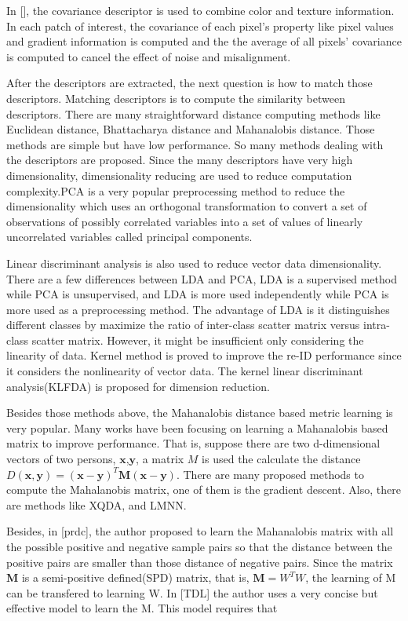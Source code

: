 \documentclass[conference,compsoc]{IEEEtran}
\begin{document}
In [], the covariance descriptor is used to combine color and texture information. In each patch of interest, the covariance of each pixel's property like pixel values and gradient information is computed and the the average of all pixels' covariance is computed to cancel the effect of noise and misalignment. 

After the descriptors are extracted, the next question is how to match those descriptors. Matching descriptors is to compute the similarity between descriptors. There are many straightforward distance computing methods like Euclidean distance, Bhattacharya distance and Mahanalobis distance.  Those methods are simple but have low performance. So many methods dealing with the descriptors are proposed. Since the many descriptors have very high dimensionality, dimensionality reducing are used to reduce computation complexity.PCA is a very popular preprocessing method to reduce the dimensionality which uses an orthogonal transformation to convert a set of observations of possibly correlated variables into a set of values of linearly uncorrelated variables called principal components. 

Linear discriminant analysis is also used to reduce vector data dimensionality. There are a few differences between LDA and PCA, LDA is a supervised method while PCA is unsupervised, and LDA is more used independently while PCA is more used as a preprocessing method. The advantage of LDA is it distinguishes different classes by maximize the ratio of inter-class scatter matrix versus intra-class scatter matrix. However, it might be insufficient only considering the linearity of data. Kernel method is proved to improve the re-ID performance since it considers the nonlinearity of vector data. The kernel linear discriminant analysis(KLFDA) is proposed for dimension reduction.  


Besides those methods above, the Mahanalobis distance based metric learning is very popular. Many works have been focusing on learning a Mahanalobis based matrix to improve performance. That is, suppose there are two d-dimensional vectors of two persons,  $\bm{x}$,$\bm{y}$, a matrix $M$ is used the calculate the distance $D(\bm{x},\bm{y}) = (\bm{x}-\bm{y})^T\bm{M}(\bm{x}-\bm{y})$. 
There are many proposed methods to compute the Mahalanobis matrix, one of them is the gradient descent. Also, there are methods like XQDA, and LMNN.

Besides, in [prdc],  the author proposed to learn the Mahanalobis matrix with all the possible positive and negative sample pairs so that the distance between the positive pairs are smaller than those distance of negative pairs. Since the matrix $\bm{M}$ is a semi-positive defined(SPD) matrix, that is, $\bm{M} = W^TW$, the learning of M can be transfered to learning W. In [TDL] the author uses a very concise but effective model to learn the M. This model requires that 
\end{document}
